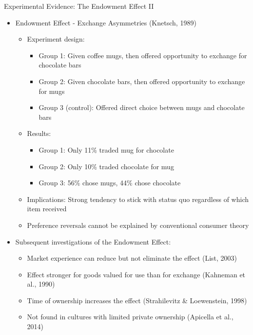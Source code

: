 \documentclass[10pt]{beamer}
\begin{document}
\begin{frame}{Experimental Evidence: The Endowment Effect II}
  \begin{itemize}[<+->]
    \item Endowment Effect - Exchange Asymmetries (Knetsch, 1989)
      \begin{itemize}
        \item Experiment design:
          \begin{itemize}
            \item Group 1: Given coffee mugs, then offered opportunity to exchange for chocolate bars
            \item Group 2: Given chocolate bars, then offered opportunity to exchange for mugs
            \item Group 3 (control): Offered direct choice between mugs and chocolate bars
          \end{itemize}
        \item Results:
          \begin{itemize}
            \item Group 1: Only 11\% traded mug for chocolate
            \item Group 2: Only 10\% traded chocolate for mug
            \item Group 3: 56\% chose mugs, 44\% chose chocolate
          \end{itemize}
        \item Implications: Strong tendency to stick with status quo regardless of which item received
        \item Preference reversals cannot be explained by conventional consumer theory
      \end{itemize}
    \item Subsequent investigations of the Endowment Effect:
      \begin{itemize}
        \item Market experience can reduce but not eliminate the effect (List, 2003)
        \item Effect stronger for goods valued for use than for exchange (Kahneman et al., 1990)
        \item Time of ownership increases the effect (Strahilevitz \& Loewenstein, 1998)
        \item Not found in cultures with limited private ownership (Apicella et al., 2014)
      \end{itemize}
  \end{itemize}
\end{frame}
\end{document}
